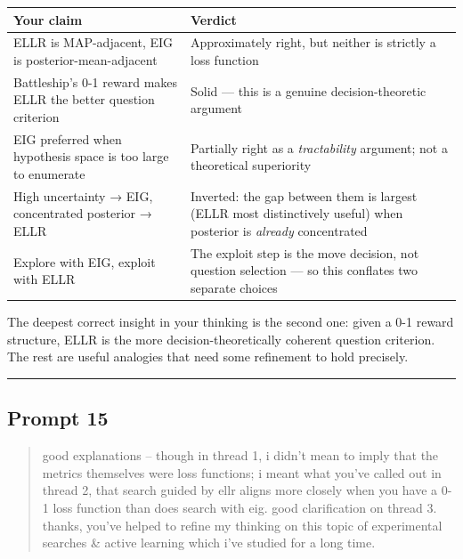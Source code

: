 \documentclass[
]{article}
\begin{document}
\begin{longtable}[]{@{}
  >{\raggedright\arraybackslash}p{}
  >{\raggedright\arraybackslash}p{}@{}}
\toprule\noalign{}
\begin{minipage}[b]{\linewidth}\raggedright
Your claim
\end{minipage} & \begin{minipage}[b]{\linewidth}\raggedright
Verdict
\end{minipage} \\
\midrule\noalign{}
\endhead
\bottomrule\noalign{}
\endlastfoot
ELLR is MAP-adjacent, EIG is posterior-mean-adjacent & Approximately
right, but neither is strictly a loss function \\
Battleship's 0-1 reward makes ELLR the better question criterion & Solid
--- this is a genuine decision-theoretic argument \\
EIG preferred when hypothesis space is too large to enumerate &
Partially right as a \emph{tractability} argument; not a theoretical
superiority \\
High uncertainty → EIG, concentrated posterior → ELLR & Inverted: the
gap between them is largest (ELLR most distinctively useful) when
posterior is \emph{already} concentrated \\
Explore with EIG, exploit with ELLR & The exploit step is the move
decision, not question selection --- so this conflates two separate
choices \\
\end{longtable}

The deepest correct insight in your thinking is the second one: given a
0-1 reward structure, ELLR is the more decision-theoretically coherent
question criterion. The rest are useful analogies that need some
refinement to hold precisely.

\begin{center}\rule{0.5\linewidth}{0.5pt}\end{center}

\subsection{Prompt 15}\label{prompt-15}

\begin{quote}
good explanations -- though in thread 1, i didn't mean to imply that the
metrics themselves were loss functions; i meant what you've called out
in thread 2, that search guided by ellr aligns more closely when you
have a 0-1 loss function than does search with eig. good clarification
on thread 3. thanks, you've helped to refine my thinking on this topic
of experimental searches \& active learning which i've studied for a
long time.
\end{quote}
\end{document}
